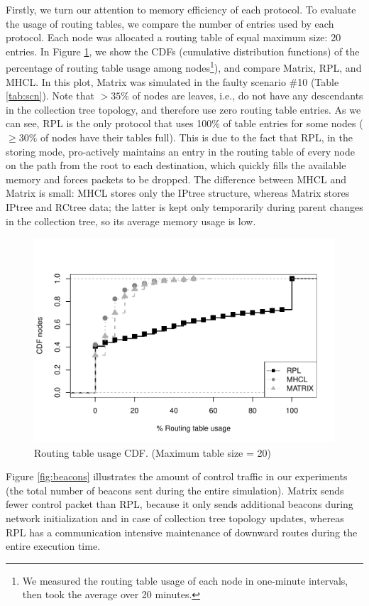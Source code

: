 Firstly, we turn our attention to memory efficiency of each protocol.
To evaluate the usage of routing tables, we compare the number of entries used
by each protocol. Each node was allocated a routing table of equal maximum size:
20 entries.
In Figure \ref{fig:table-usage}, we show the CDFs (cumulative distribution
functions) of the percentage of routing table usage among nodes\footnote{We
measured the routing table usage of each node in one-minute intervals, then
took the average over 20 minutes. }), and compare Matrix,
RPL, and MHCL.
In this plot, Matrix was simulated in the faulty scenario \#10 (Table \ref{tab:scn}).
Note that $>35\%$ of nodes are leaves,
i.e., do not have any descendants in the collection tree topology,
and therefore use zero routing table entries.
As we can see, RPL is the only protocol that uses 100\% of table
entries for some nodes ($\geq30\%$ of nodes have their tables full).
This is due to the fact that RPL, in the storing mode, pro-actively
maintains an entry in the routing table of every node on the path
from the root to each destination, which quickly fills the available
memory and forces packets to be dropped. 
The difference between MHCL and Matrix is small: MHCL
stores only the IPtree structure, whereas Matrix stores IPtree and
RCtree data; the latter is kept only temporarily during parent
changes in the collection tree, so its average memory usage is low.

\begin{figure}[h]
    \centering
    \includegraphics[width=0.95\linewidth]{Images/tableentries.pdf}
    \caption{Routing table usage CDF. (Maximum table size = 20)}
    \label{fig:table-usage}
\end{figure}

Figure \ref{fig:beacons} illustrates the amount of control traffic
in our experiments (the total number of beacons sent during the entire
simulation).
Matrix sends fewer control packet than RPL, because it
only sends additional beacons during network initialization and in
case of collection tree topology updates, whereas RPL has a communication
intensive maintenance of downward routes during the entire execution time. 

